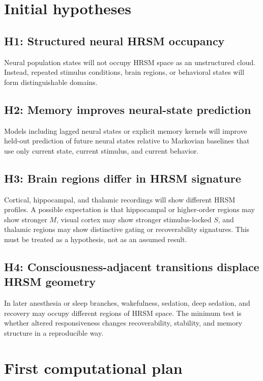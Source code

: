 \documentclass[11pt]{article}
\begin{document}
\section{Initial hypotheses}

\subsection{H1: Structured neural HRSM occupancy}

Neural population states will not occupy HRSM space as an unstructured cloud. Instead, repeated stimulus conditions, brain regions, or behavioral states will form distinguishable domains.

\subsection{H2: Memory improves neural-state prediction}

Models including lagged neural states or explicit memory kernels will improve held-out prediction of future neural states relative to Markovian baselines that use only current state, current stimulus, and current behavior.

\subsection{H3: Brain regions differ in HRSM signature}

Cortical, hippocampal, and thalamic recordings will show different HRSM profiles. A possible expectation is that hippocampal or higher-order regions may show stronger $M$, visual cortex may show stronger stimulus-locked $S$, and thalamic regions may show distinctive gating or recoverability signatures. This must be treated as a hypothesis, not as an assumed result.

\subsection{H4: Consciousness-adjacent transitions displace HRSM geometry}

In later anesthesia or sleep branches, wakefulness, sedation, deep sedation, and recovery may occupy different regions of HRSM space. The minimum test is whether altered responsiveness changes recoverability, stability, and memory structure in a reproducible way.

\section{First computational plan}
\end{document}
